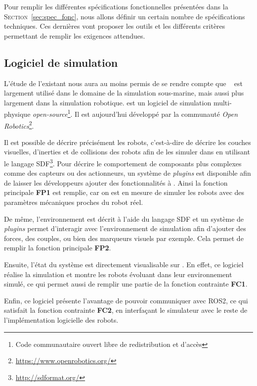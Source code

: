         Pour remplir les différentes spécifications fonctionnelles présentées dans la \textsc{Section}~\ref{sec:spec_fonc}, nous allons définir un certain nombre de spécifications techniques. Ces dernières vont proposer les outils et les différents critères permettant de remplir les exigences attendues.

        \subsection{Logiciel de simulation}

            L'étude de l'existant nous aura au moins permis de se rendre compte que \gazebo{}~\cite{Koenig-gazebo} est largement utilisé dans le domaine de la simulation sous-marine, mais aussi plus largement dans la simulation robotique. \gazebo{} est un logiciel de simulation multi-physique \textit{open-source}\footnote{Code communautaire ouvert libre de redistribution et d'accès}. Il est aujourd'hui développé par la communauté \textit{Open Robotics}\footnote{\url{https://www.openrobotics.org/}}.
            
            Il est possible de décrire précisément les robots, c'est-à-dire de décrire les couches visuelles, d'inerties et de collisions des robots afin de les simuler dans \gazebo{} en utilisant le langage \gls{SDF}\footnote{\url{http://sdformat.org/}}. Pour décrire le comportement de composants plus complexes comme des capteurs ou des actionneurs, un système de \textit{plugins} est disponible afin de laisser les développeurs ajouter des fonctionnalités à \gazebo{}. Ainsi la fonction principale \textbf{FP1} est remplie, car on est en mesure de simuler les robots avec des paramètres mécaniques proches du robot réel.

            De même, l'environnement est décrit à l'aide du langage \gls{SDF} et un système de \textit{plugins} permet d'interagir avec l'environnement de simulation afin d'ajouter des forces, des couples, ou bien des marqueurs visuels par exemple. Cela permet de remplir la fonction principale \textbf{FP2}.

            Ensuite, l'état du système est directement visualisable sur \gazebo{}. En effet, ce logiciel réalise la simulation et montre les robots évoluant dans leur environnement simulé, ce qui permet aussi de remplir une partie de la fonction contrainte \textbf{FC1}.

            Enfin, ce logiciel présente l'avantage de pouvoir communiquer avec \gls{ROS2}, ce qui satisfait la fonction contrainte \textbf{FC2}, en interfaçant le simulateur avec le reste de l'implémentation logicielle des robots.


